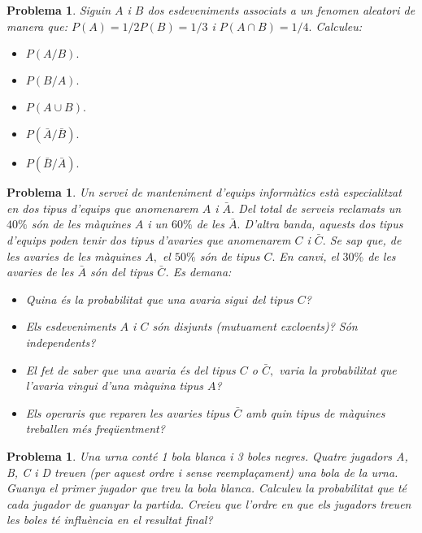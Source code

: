 \documentclass[11pt]{article}
\newcounter{prbcont}
\newtheorem{problema}[prbcont]{Problema}
\begin{document}
\begin{problema}
Siguin $A$ i $B$ dos esdeveniments associats a un fenomen aleatori de manera que: $P(A)=1/2 P(B) = 1/3$ i $P (A\cap B)= 1/4.$ Calculeu:
\begin{itemize}
\item [(a)] $ P(A/B).$
\item [(b)] $ P(B/A).$
\item [(c)] $ P(A\cup B).$
\item [(d)] $ P(\bar{A}/\bar{B}).$
\item [(e)] $ P(\bar{B}/\bar{A}).$ %
\end{itemize}
\end{problema}

\begin{problema}
Un servei de manteniment d'equips inform\`atics est\`a especialitzat en dos tipus d'equips que anomenarem $A$ i $\bar{A}$. Del total de serveis reclamats un $40\%$ s\'on de les m\`aquines $A$ i un $60\%$ de les $\bar{A}.$ D'altra banda, aquests dos tipus d'equips poden tenir dos tipus d'avaries que anomenarem $C$ i $\bar{C}.$ Se sap que, de les avaries de les m\`aquines $A,$ el $50\%$ s\'on de tipus $C.$ En canvi, el $30\%$ de les avaries de les $\bar{A}$ s\'on del tipus $\bar{C}$. Es demana:
\begin{itemize}
\item [(a)] Quina \'es la probabilitat que una avaria sigui del tipus $C$? %
\item [(b)] Els esdeveniments $A$ i $C$ s\'on disjunts (mutuament excloents)? S\'on independents? %
\item [(c)] El fet de saber que una avaria \'es del tipus $C$ o $\bar{C},$ varia la probabilitat que l'avaria vingui d'una m\`aquina tipus $A$?
\item [(d)] Els operaris que reparen les avaries tipus $\bar{C}$ amb quin tipus de m\`aquines treballen m\'es freq\"uentment?
\end{itemize}
\end{problema}

\begin{problema}
Una urna cont\'e 1 bola blanca i 3 boles negres. Quatre jugadors A, B, C i D treuen (per aquest ordre i sense reempla\c{c}ament) una bola de la urna. Guanya el primer jugador que treu la bola blanca. Calculeu la probabilitat que t\'e cada jugador de guanyar la partida. Creieu que l'ordre en que els jugadors treuen les boles t\'e influ\`encia en el resultat final? %
\end{problema}
\end{document}
